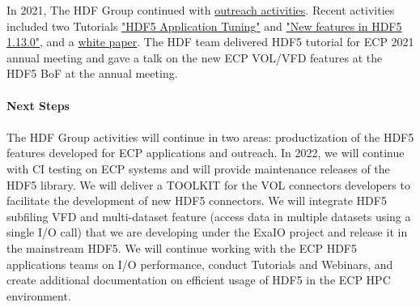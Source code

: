 In 2021, The HDF Group continued with \href{https://www.hdfgroup.org/category/hdf5-resources-for-ecp-users/}{outreach activities}. Recent activities included two Tutorials \href{https://www.hdfgroup.org/2021/05/webinar-followup-hdf5-application-tuning-there-is-more-than-one-way-to-skin-a-catfish-part-2/} {"HDF5 Application Tuning"} and \href{https://www.hdfgroup.org/2021/09/webinar-followup-new-features-in-the-hdf5-1-13-0-release}{"New features in HDF5 1.13.0"}, and a \href{https://portal.hdfgroup.org/pages/viewpage.action?pageId=73924784}{white paper}. The HDF team delivered HDF5 tutorial for ECP 2021 annual meeting and gave a talk on the new ECP VOL/VFD features at the HDF5 BoF at the annual meeting.


\paragraph{Next Steps}
\paragraph{}
The HDF Group activities will continue in two areas:  productization of the HDF5 features developed for ECP applications and outreach. In 2022, we will continue with CI testing on ECP systems and will provide maintenance releases of the HDF5 library.  We will deliver a TOOLKIT for the VOL connectors developers to facilitate the development of new HDF5 connectors. We will integrate HDF5 subfiling VFD and multi-dataset feature (access data in multiple datasets using a single I/O call) that we are developing under the ExaIO project and release it in the mainstream HDF5. We will continue working with the ECP HDF5 applications teams on I/O performance, conduct Tutorials and Webinars, and create additional documentation on efficient usage of HDF5 in the ECP HPC environment. 
